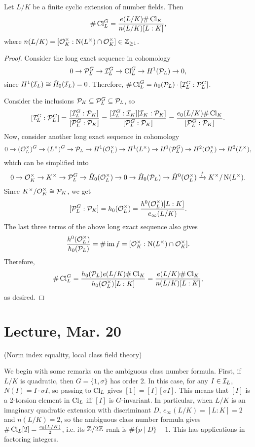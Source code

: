 \documentclass[11pt]{amsart}
\begin{document}
\begin{thm}
    Let $L/K$ be a finite cyclic extension of number fields. Then
    \[\#\operatorname{Cl}_L^G = \frac{e(L/K) \#\operatorname{Cl}_K}{n(L/K)[L:K]},\]
    where $n(L/K) = [\mathcal{O}_K^\times : \operatorname{N}(L^\times)\cap \mathcal{O}_K^\times] \in \mathbb{Z}_{\ge 1}$.
\end{thm}


\begin{proof}
    Consider the long exact sequence in cohomology
    \[0 \to \mathcal{P}_L^G \to \mathcal{I}_L^G \to \operatorname{Cl}_L^G \to H^1(\mathcal{P}_L) \to 0,\]
    since $H^1(\mathcal{I}_L) \cong \hat{H}_0(\mathcal{I}_L) = 0$. Therefore, $\#\operatorname{Cl}_L^G = h_0(\mathcal{P}_L)\cdot [\mathcal{I}_L^G : \mathcal{P}_L^G]$. 

    Consider the inclusions $\mathcal{P}_K \subseteq \mathcal{P}_L^G \subseteq \mathcal{P}_L$, so 
    \[[\mathcal{I}_L^G:\mathcal{P}_L^G] = \frac{[\mathcal{I}_L^G : \mathcal{P}_K]}{[\mathcal{P}_L^G: \mathcal{P}_K]} = \frac{[\mathcal{I}_L^G : \mathcal{I}_K][\mathcal{I}_K:\mathcal{P}_K]}{[\mathcal{P}_L^G: \mathcal{P}_K]} = \frac{e_0(L/K)\#\operatorname{Cl}_K}{[\mathcal{P}_L^G: \mathcal{P}_K]}.\]
    Now, consider another long exact sequence in cohomology
    \[0 \to (\mathcal{O}_L^\times)^G \to (L^\times)^G \to \mathcal{P}_L \to H^1(\mathcal{O}_L^\times) \to H^1(L^\times) \to H^1(\mathcal{P}_L^G) \to H^2(\mathcal{O}_L^\times) \to H^2(L^\times),\]
    which can be simplified into
    \[0 \to \mathcal{O}_K^\times \to K^\times \to \mathcal{P}_L^G \to \hat{H}_0(\mathcal{O}_L^\times) \to 0 \to \hat{H}_0(\mathcal{P}_L) \to \hat{H}^0(\mathcal{O}_L^\times) \xrightarrow{f} K^\times/\operatorname{N}(L^\times).\]
    Since $K^\times/\mathcal{O}_K^\times \cong \mathcal{P}_K$, we get
    \[[\mathcal{P}_L^G: \mathcal{P}_K] = h_0(\mathcal{O}_L^\times) = \frac{h^0(\mathcal{O}_L^\times)[L:K]}{e_\infty(L/K)}.\]
    The last three terms of the above long exact sequence also gives
    \[\frac{h^0(\mathcal{O}_L^\times)}{h_0(\mathcal{P}_L)} = \#\operatorname{im} f = [\mathcal{O}_K^\times : \operatorname{N}(L^\times)\cap \mathcal{O}_K^\times].\]
    Therefore,
    \[\#\operatorname{Cl}_L^G = \frac{h_0(\mathcal{P}_L)e(L/K)\#\operatorname{Cl}_K}{h_0(\mathcal{O}_L^\times)[L:K]} = \frac{e(L/K) \#\operatorname{Cl}_K}{n(L/K)[L:K]},\]
    as desired.
\end{proof}

\section{Lecture, Mar. 20}

(Norm index equality, local class field theory)

We begin with some remarks on the ambiguous class number formula. First, if $L/K$ is quadratic, then $G = \{1,\sigma\}$ has order 2. In this case, for any $I\in \mathcal{I}_L$, $N(I) = I\cdot \sigma I$, so passing to $\operatorname{Cl}_L$ gives $[1] = [I][\sigma I]$. This means that $[I]$ is a 2-torsion element in $\operatorname{Cl}_L$ iff $[I]$ is $G$-invariant. In particular, when $L/K$ is an imaginary quadratic extension with discriminant $D$, $e_\infty(L/K) = [L:K] = 2$ and $n(L/K) = 2$, so the ambiguous class number formula gives $\#\operatorname{Cl}_L[2] = \frac{e_0(L/K)}{2}$, i.e. its $\mathbb{Z}/2\mathbb{Z}$-rank is $\#\{p\mid D\}-1$. This has applications in factoring integers.
\end{document}

